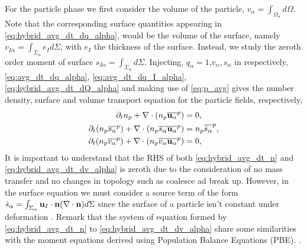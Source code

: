 For the particle phase we first consider the volume of the particle, $v_\alpha = \int_{\Omega_\alpha} d\Omega$.
Note that the corresponding surface quantities appearing in \ref{eq:hybrid_avg_dt_dq_alpha}, would be the volume of the surface, namely $v_{I\alpha} = \int_{\Sigma_\alpha} e_I d\Sigma$, with $e_I$ the thickness of the surface. 
Instead,  we study the zeroth order moment of surface $s_{I\alpha} = \int_{\Sigma_\alpha} d\Sigma$. 
Injecting, $q_\alpha = 1$,$v_\alpha, s_\alpha$ in respectively, \ref{eq:avg_dt_dq_alpha}, \ref{eq:avg_dt_dq_I_alpha}, \ref{eq:hybrid_avg_dt_dQ_alpha} and making use of \ref{eq:p_avg} gives the number density, surface and volume transport equation for the particle fields, respectively,
\begin{align}
    \partial_t n_p
    + \mathbf{\nabla} \cdot (n_p\overline{\textbf{u}_\alpha}^{p})
    &= 
    0,
    \label{eq:hybrid_avg_dt_n}\\
    \partial_t (n_p\overline{s_\alpha}^{p})
    + \mathbf{\nabla} \cdot (n_p\overline{s_\alpha\textbf{u}_\alpha}^{p})
    &= n_p\overline{\dot{s}_\alpha}^{p},
    \label{eq:hybrid_avg_dt_ds_alpha}\\
    \partial_t (n_p\overline{v_\alpha}^{p})
    + \mathbf{\nabla} \cdot (n_p\overline{v_\alpha\textbf{u}_\alpha}^{p})
    &= 0,
    \label{eq:hybrid_avg_dt_dv_alpha}
\end{align}
It is important to understand that the RHS of both \ref{eq:hybrid_avg_dt_n} and \ref{eq:hybrid_avg_dt_dv_alpha} is zeroth due to the consideration of no mass transfer and no changes in topology such as coalesce ad break up.
However, in the surface equation we must consider a source term of the form $\dot{s}_\alpha = \int_{\Sigma_\alpha} \textbf{u}_I \cdot \textbf{n}(\mathbf{\nabla} \cdot \textbf{n}) d\Sigma$ since the surface of a particle isn't constant under deformation \citep{morel2007surface}. Remark that the system of equation formed by \ref{eq:hybrid_avg_dt_n} to \ref{eq:hybrid_avg_dt_dv_alpha} share some similarities with the moment equations derived using Population Balance Equations (PBE)\citet{KAMP20011363,marchisio2013computational}. .

